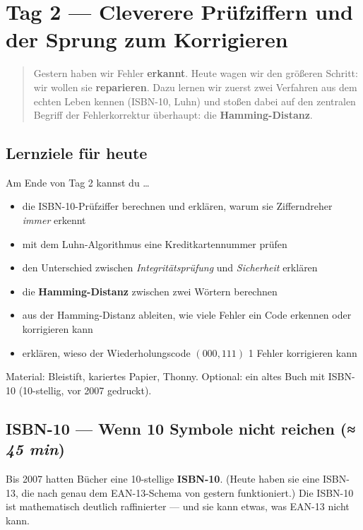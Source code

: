 \chapter{Tag 2 — Cleverere Prüfziffern und der Sprung zum Korrigieren}

\begin{quote}
Gestern haben wir Fehler \textbf{erkannt}. Heute wagen wir den größeren
Schritt: wir wollen sie \textbf{reparieren}. Dazu lernen wir zuerst
zwei Verfahren aus dem echten Leben kennen (ISBN-10, Luhn) und stoßen
dabei auf den zentralen Begriff der Fehlerkorrektur überhaupt: die
\textbf{Hamming-Distanz}.
\end{quote}

\section*{Lernziele für heute}

Am Ende von Tag 2 kannst du \dots

\begin{itemize}
\item die ISBN-10-Prüfziffer berechnen und erklären, warum sie
  Zifferndreher \emph{immer} erkennt
\item mit dem Luhn-Algorithmus eine Kreditkartennummer prüfen
\item den Unterschied zwischen \emph{Integritätsprüfung} und
  \emph{Sicherheit} erklären
\item die \textbf{Hamming-Distanz} zwischen zwei Wörtern berechnen
\item aus der Hamming-Distanz ableiten, wie viele Fehler ein Code
  erkennen oder korrigieren kann
\item erklären, wieso der Wiederholungscode $(000, 111)$ 1 Fehler
  korrigieren kann
\end{itemize}

Material: Bleistift, kariertes Papier, Thonny. Optional: ein altes
Buch mit ISBN-10 (10-stellig, vor 2007 gedruckt).

\section{ISBN-10 — Wenn 10 Symbole nicht reichen \normalfont(\textit{≈ 45 min})}

Bis 2007 hatten Bücher eine 10-stellige \textbf{ISBN-10}. (Heute haben
sie eine ISBN-13, die nach genau dem EAN-13-Schema von gestern
funktioniert.) Die ISBN-10 ist mathematisch deutlich raffinierter —
und sie kann etwas, was EAN-13 nicht kann.

